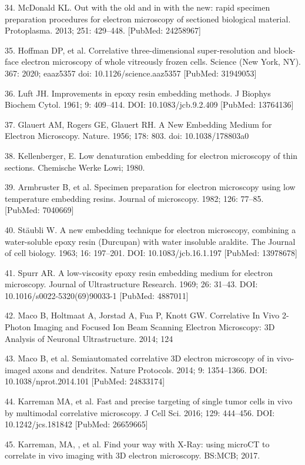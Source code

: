 \documentclass{article}
\begin{document}
\begin{hangpars}
34. McDonald KL. Out with the old and in with the new: rapid specimen preparation procedures for electron microscopy of sectioned biological material. Protoplasma. 2013; 251: 429–448. [PubMed: 24258967]

35. Hoffman DP, et al. Correlative three-dimensional super-resolution and block-face electron microscopy of whole vitreously frozen cells. Science (New York, NY). 367: 2020; eaaz5357 doi: 10.1126/science.aaz5357 [PubMed: 31949053]

36. Luft JH. Improvements in epoxy resin embedding methods. J Biophys Biochem Cytol. 1961; 9: 409–414. DOI: 10.1083/jcb.9.2.409 [PubMed: 13764136]

37. Glauert AM, Rogers GE, Glauert RH. A New Embedding Medium for Electron Microscopy. Nature. 1956; 178: 803. doi: 10.1038/178803a0

38. Kellenberger, E. Low denaturation embedding for electron microscopy of thin sections. Chemische Werke Lowi; 1980.

39. Armbruster B, et al. Specimen preparation for electron microscopy using low temperature embedding resins. Journal of microscopy. 1982; 126: 77–85. [PubMed: 7040669]

40. Stäubli W. A new embedding technique for electron microscopy, combining a water-soluble epoxy resin (Durcupan) with water insoluble araldite. The Journal of cell biology. 1963; 16: 197–201. DOI: 10.1083/jcb.16.1.197 [PubMed: 13978678]

41. Spurr AR. A low-viscosity epoxy resin embedding medium for electron microscopy. Journal of Ultrastructure Research. 1969; 26: 31–43. DOI: 10.1016/s0022-5320(69)90033-1 [PubMed: 4887011]

42. Maco B, Holtmaat A, Jorstad A, Fua P, Knott GW. Correlative In Vivo 2-Photon Imaging and Focused Ion Beam Scanning Electron Microscopy: 3D Analysis of Neuronal Ultrastructure. 2014; 124

43. Maco B, et al. Semiautomated correlative 3D electron microscopy of in vivo-imaged axons and dendrites. Nature Protocols. 2014; 9: 1354–1366. DOI: 10.1038/nprot.2014.101 [PubMed: 24833174]

44. Karreman MA, et al. Fast and precise targeting of single tumor cells in vivo by multimodal correlative microscopy. J Cell Sci. 2016; 129: 444–456. DOI: 10.1242/jcs.181842 [PubMed: 26659665]

45. Karreman, MA, , et al. Find your way with X-Ray: using microCT to correlate in vivo imaging with 3D electron microscopy. BS:MCB; 2017.


\end{hangpars}
\end{document}
